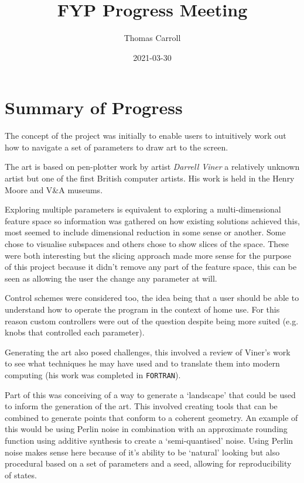 \documentclass[10pt,a4paper]{article}
\title{FYP Progress Meeting}
\author{Thomas Carroll}
\date{2021-03-30}
\begin{document}
\maketitle{}
\section{Summary of Progress}
The concept of the project was initially to enable users to intuitively work out
how to navigate a set of parameters to draw art to the screen.

The art is based on pen-plotter work by artist \emph{Darrell Viner} a relatively
unknown artist but one of the first British computer artists. His work is held
in the Henry Moore and V\&A museums.

Exploring multiple parameters is equivalent to exploring a multi-dimensional
feature space so information was gathered on how existing solutions achieved
this, most seemed to include dimensional reduction in some sense or another.
Some chose to visualise subspaces and others chose to show slices of the space.
These were both interesting but the slicing approach made more sense for the
purpose of this project because it didn't remove any part of the feature space,
this can be seen as allowing the user the change any parameter at will.

Control schemes were considered too, the idea being that a user should be able
to understand how to operate the program in the context of home use. For this
reason custom controllers were out of the question despite being more suited
(e.g. knobs that controlled each parameter).

Generating the art also posed challenges, this involved a review of Viner's work
to see what techniques he may have used and to translate them into modern
computing (his work was completed in \verb|FORTRAN|). 

Part of this was conceiving of a way to generate a `landscape' that could be
used to inform the generation of the art. This involved creating tools that can
be combined to generate points that conform to a coherent geometry. An example
of this would be using Perlin noise in combination with an approximate rounding
function using additive synthesis to create a `semi-quantised' noise. Using
Perlin noise makes sense here because of it's ability to be `natural' looking
but also procedural based on a set of parameters and a seed, allowing for
reproducibility of states.
\end{document}
